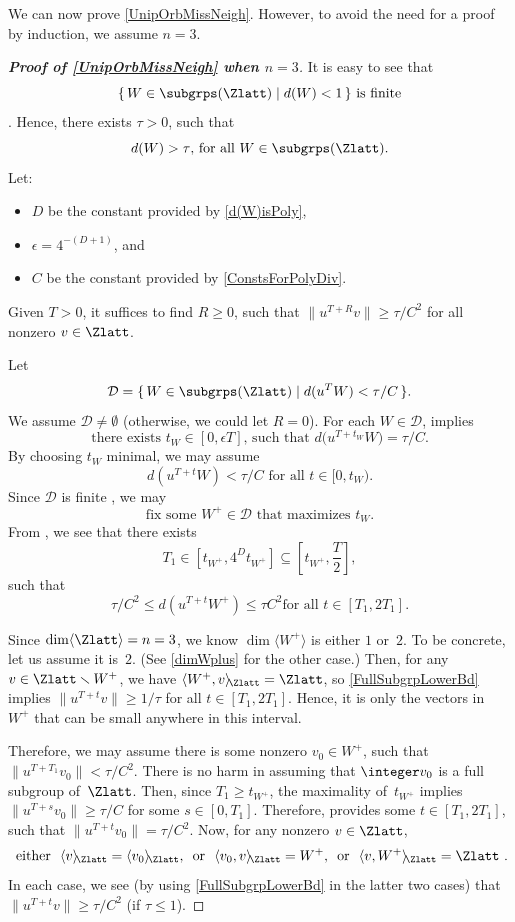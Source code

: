 We can now prove \cref{UnipOrbMissNeigh}. However, to avoid the need for a proof by induction, we assume $n = 3$. 

\begin{proof}[\bf Proof of \cref{UnipOrbMissNeigh} when $n = 3$]
It is easy to see that 
	$$ \text{$\{\, W \in \subgrps(\Zlatt) \mid d(W) < 1 \,\}$ is finite} $$
. Hence, there exists $\tau > 0$, such that
	$$ \text{$d(W) > \tau$, for all $W \in \subgrps(\Zlatt)$.} $$
Let:
\noprelistbreak
	\begin{itemize}
	\item $D$ be the constant provided by \cref{d(W)isPoly},
	\item $\epsilon = 4^{-(D+1)}$,
	and
	\item $C$ be the constant provided by \cref{ConstsForPolyDiv}.
	\end{itemize}
Given $T > 0$, it suffices to find $R \ge 0$, such that $\|u^{T+R} v\| \ge \tau/C^2$ for all nonzero $v \in \Zlatt$.

Let 
	$$ \mathcal{D} = \{\, W  \in \subgrps(\Zlatt) \mid d ( u^T W ) < \tau/C\,\} .$$
We assume $\mathcal{D} \neq \emptyset$ (otherwise, we could let $R = 0$). For each $W \in \mathcal{D}$,  implies 
	$$ \text{there exists $t_{W} \in [0,  \epsilon T]$, such that $d \bigl( u^{T + t_W} W \bigr) = \tau/C$} .$$
By choosing $t_W$ minimal, we may assume
	$$ \text{$d(u^{T + t}W) < \tau/C$ \ for all $t \in [0,  t_W)$} .$$
Since $\mathcal{D}$ is finite , we may 
	$$ \text{fix some $W^+ \in \mathcal{D}$ that maximizes $t_{W}$.} $$
 From , we see that there exists 
 	$$T_1 \in [t_{W^+}, 4^D t_{W^+}] \subseteq \left[t_{W^+}, \frac{T}{2} \right] ,$$
such that 
	$$ \text{$\tau/C^2 \le d ( u^{T+t} W^+ ) \le \tau C^2$
	\ for all $t \in [T_1, 2T_1]$.} $$

Since $\dim \langle \Zlatt \rangle = n = 3$, we know $\dim \langle W^+ \rangle$ is either $1$ or~$2$. To be concrete, let us assume it is~$2$. (See \cref{dimWplus} for the other case.) Then, for any $v \in \Zlatt \smallsetminus W^+$, we have $\langle W^+, v \rangle\!_{\Zlatt} = \Zlatt$, so \cref{FullSubgrpLowerBd} implies $\| u^{T + t} v \| \ge 1/\tau$ for all $t \in [T_1, 2T_1]$. Hence, it is only the vectors in~$W^+$ that can be small anywhere in this interval.

Therefore, we may assume there is some nonzero $v_0 \in W^+$, such that $\| u^{T+T_1} v_0 \| < \tau/C^2$. There is no harm in assuming that $\integer v_0$ is a full subgroup of~$\Zlatt$. Then, since $T_1 \ge t_{W^+}$, the maximality of~$t_{W^+}$ implies $\| u^{T+s} v_0 \| \ge \tau/C$ for some $s \in [0,T_1]$.
Therefore,  provides some $t \in [T_1, 2T_1]$, such that $\| u^{T+t} v_0 \| = \tau/C^2$.
Now, for any nonzero $v \in \Zlatt$,
	$$ \text{ either \ 
	$\langle v \rangle\!_{\Zlatt} = \langle v_0 \rangle\!_{\Zlatt}$,
	\ or \ 
	$\langle v_0, v \rangle\!_{\Zlatt} = W^+$,
	\ or \ 
	$\langle v, W^+ \rangle\!_{\Zlatt} = \Zlatt$
	}. $$
In each case, we see (by using \cref{FullSubgrpLowerBd} in the latter two cases) that $\|u^{T+t} v\| \ge \tau/C^2$ (if $\tau \le 1$).
\end{proof}




